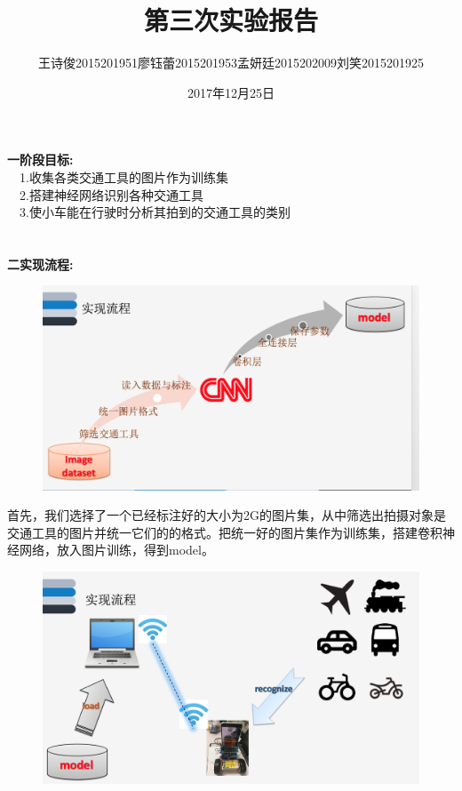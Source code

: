 \documentclass[19pt,a4paper]{article}
\title{第三次实验报告}
\author{王诗俊2015201951\quad 廖钰蕾2015201953\quad  孟妍廷2015202009\quad  刘笑2015201925}
\date{2017年12月25日}
\begin{document}
\maketitle
\textbf{一\quad 阶段目标:}\\
\indent\ \  1.收集各类交通工具的图片作为训练集\\
\indent\ \  2.搭建神经网络识别各种交通工具\\
\indent\ \  3.使小车能在行驶时分析其拍到的交通工具的类别\\
\\
\\
\indent\textbf{二\quad 实现流程:}\\ 
\begin{figure}[H]
 \centering
 \includegraphics[scale=0.4]{流程1.png}
\end{figure}
\indent 首先，我们选择了一个已经标注好的大小为2G的图片集，从中筛选出拍摄对象是交通工具的图片并统一它们的的格式。把统一好的图片集作为训练集，搭建卷积神经网络，放入图片训练，得到model。
\begin{figure}[H]
 \centering
 \includegraphics[scale=0.4]{流程2.png}
\end{figure}
\end{document}
